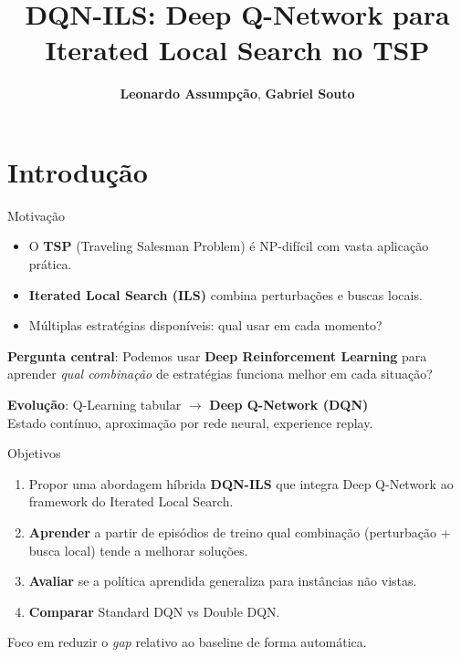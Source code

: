 \documentclass[11pt, xcolor=dvipsnames]{beamer}
\title[\sutil{DQN-ILS}]{DQN-ILS: Deep Q-Network para \\ Iterated Local Search no TSP}
\author[\sutil{Grupo RL-CO}]{\intsize \textbf{Leonardo Assumpção}, \textbf{Gabriel Souto} \\ \sutil{Lucas Barbosa, Matheus Bastos, Rafael Dias}}
\institute[UFRJ]{\intsize PESC/COPPE/UFRJ -- OTIMIA (COS887)}
\date[]{\sutil{Dezembro/2025}}
\newcommand{\destaque}[1]{\textbf{\textcolor{verde}{#1}}}
\begin{document}
\maketitle

\section{Introdução}

\begin{frame}{Motivação}
  \footnotesize
  \begin{itemize}
    \item O \destaque{TSP} (Traveling Salesman Problem) é NP-difícil com vasta aplicação prática.
    \item \destaque{Iterated Local Search (ILS)} combina perturbações e buscas locais.
    \item Múltiplas estratégias disponíveis: qual usar em cada momento?
  \end{itemize}
  \vspace{3mm}
  \begin{calloutbox}
    {\footnotesize
    \textbf{Pergunta central}: Podemos usar \destaque{Deep Reinforcement Learning} para aprender \emph{qual combinação} de estratégias funciona melhor em cada situação?
    }
  \end{calloutbox}
  \vspace{2mm}
  \begin{alertbox}
    {\scriptsize
    \textbf{Evolução}: Q-Learning tabular $\rightarrow$ \destaque{Deep Q-Network (DQN)} \\
    Estado contínuo, aproximação por rede neural, experience replay.
    }
  \end{alertbox}
\end{frame}

\begin{frame}{Objetivos}
  \footnotesize
  \begin{enumerate}
    \item Propor uma abordagem híbrida \destaque{DQN-ILS} que integra Deep Q-Network ao framework do Iterated Local Search.
    \item \destaque{Aprender} a partir de episódios de treino qual combinação (perturbação + busca local) tende a melhorar soluções.
    \item \destaque{Avaliar} se a política aprendida generaliza para instâncias não vistas.
    \item \destaque{Comparar} Standard DQN vs Double DQN.
  \end{enumerate}
  \vspace{4mm}
  \begin{calloutbox}
    {\scriptsize
    Foco em reduzir o \emph{gap} relativo ao baseline de forma automática.
    }
  \end{calloutbox}
\end{frame}
\end{document}
